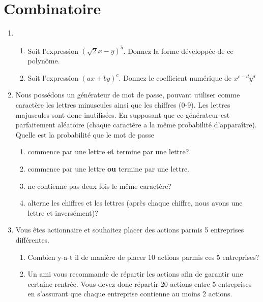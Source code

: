 \documentclass[A4paper,11pt]{article}
\begin{document}
\section{Combinatoire}
\begin{enumerate}
    \item \begin{enumerate}
        \item Soit l'expression $(\sqrt{2}x - y )^5$. Donnez la forme développée de ce polynôme.
        \item Soit l'expression $(ax + by)^c$. Donnez le coefficient numérique de $x^{c-d}y^d$
    \end{enumerate}
    \item Nous possédons un générateur de mot de passe, pouvant utiliser comme caractère les lettres minuscules ainsi que les chiffres (0-9). Les lettres majuscules sont donc inutilisées. En supposant que ce générateur est parfaitement aléatoire (chaque caractère a la même probabilité d'apparaître). Quelle est la probabilité que le mot de passe
    \begin{enumerate}
        \item  commence par une lettre \textbf{et} termine par une lettre?
        \item  commence par une lettre \textbf{ou} termine par une lettre.
        \item ne contienne pas deux fois le même caractère?
        \item alterne les chiffres et les lettres (après chaque chiffre, nous avons une lettre et inversément)?
    \end{enumerate}
    
    \item Vous êtes actionnaire et souhaitez placer des actions parmis 5 entreprises différentes.
    \begin{enumerate}
        \item Combien y-a-t il de manière de placer 10 actions parmis ces 5 entreprises?
        \item Un ami vous recommande de répartir les actions afin de garantir une certaine rentrée. Vous devez donc répartir 20 actions entre 5 entreprises en s'assurant que chaque entreprise contienne au moins 2 actions.
    \end{enumerate}
\end{enumerate}
\end{document}
